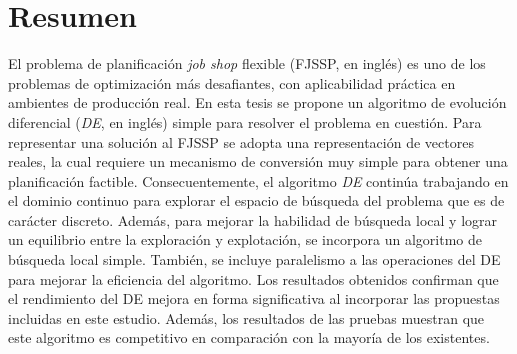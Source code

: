  \chapter*{Resumen} 

El problema de planificación \textit{job shop} flexible (FJSSP, en inglés) es uno de los problemas de optimización más desafiantes, con aplicabilidad práctica en ambientes de producción real. En esta tesis se propone un algoritmo de evolución diferencial (\textit{DE}, en inglés) simple para resolver el problema en cuestión. Para representar una solución al FJSSP se adopta una representación de vectores reales, la cual requiere un mecanismo de conversión muy simple para obtener una planificación factible. Consecuentemente, el algoritmo \textit{DE} continúa trabajando en el dominio continuo para explorar el espacio de búsqueda del problema que es de carácter discreto. Además, para mejorar la habilidad de búsqueda local y lograr un equilibrio entre la exploración y explotación, se incorpora un algoritmo de búsqueda local simple. También, se incluye paralelismo a las operaciones del DE para mejorar la eficiencia del algoritmo. Los resultados obtenidos confirman que el rendimiento del DE mejora en forma significativa al incorporar las propuestas incluidas en este estudio.
Además, los resultados de las pruebas muestran que este algoritmo es competitivo en comparación con la mayoría de los existentes.